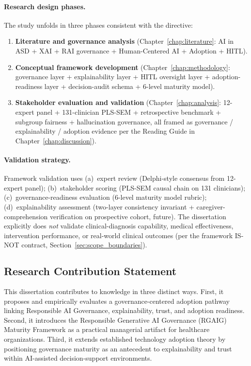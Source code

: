 \paragraph{Research design phases.} The study unfolds in three phases consistent with the directive:
\begin{enumerate}[leftmargin=*, itemsep=2pt, label=(\roman*)]
    \item \textbf{Literature and governance analysis} (Chapter~\ref{chap:literature}: AI in ASD + XAI + RAI governance + Human-Centered AI + Adoption + HITL).
    \item \textbf{Conceptual framework development} (Chapter~\ref{chap:methodology}: governance layer + explainability layer + HITL oversight layer + adoption-readiness layer + decision-audit schema + 6-level maturity model).
    \item \textbf{Stakeholder evaluation and validation} (Chapter~\ref{chap:analysis}: 12-expert panel + 131-clinician PLS-SEM + retrospective benchmark + subgroup fairness + hallucination governance, all framed as governance / explainability / adoption evidence per the Reading Guide in Chapter~\ref{chap:discussion}).
\end{enumerate}

\paragraph{Validation strategy.} Framework validation uses (a)~expert review (Delphi-style consensus from 12-expert panel); (b)~stakeholder scoring (PLS-SEM causal chain on 131 clinicians); (c)~governance-readiness evaluation (6-level maturity model rubric); (d)~explainability assessment (two-layer consistency invariant + caregiver-comprehension verification on prospective cohort, future). The dissertation explicitly does \emph{not} validate clinical-diagnosis capability, medical effectiveness, intervention performance, or real-world clinical outcomes (per the framework IS-NOT contract, Section~\ref{sec:scope_boundaries}).



\subsection{Research Contribution Statement}
\label{sec:research_contribution_statement}

\noindent This dissertation contributes to knowledge in three distinct ways. First, it proposes and empirically evaluates a governance-centered adoption pathway linking Responsible AI Governance, explainability, trust, and adoption readiness. Second, it introduces the Responsible Generative AI Governance (RGAIG) Maturity Framework as a practical managerial artifact for healthcare organizations. Third, it extends established technology adoption theory by positioning governance maturity as an antecedent to explainability and trust within AI-assisted decision-support environments.

